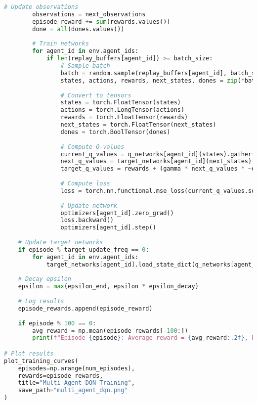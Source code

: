 \begin{lstlisting}[language=python, caption=Multi-Agent DQN Training]
        # Update observations
        observations = next_observations
        episode_reward += sum(rewards.values())
        done = all(dones.values())
        
        # Train networks
        for agent_id in env.agent_ids:
            if len(replay_buffers[agent_id]) >= batch_size:
                # Sample batch
                batch = random.sample(replay_buffers[agent_id], batch_size)
                states, actions, rewards, next_states, dones = zip(*batch)
                
                # Convert to tensors
                states = torch.FloatTensor(states)
                actions = torch.LongTensor(actions)
                rewards = torch.FloatTensor(rewards)
                next_states = torch.FloatTensor(next_states)
                dones = torch.BoolTensor(dones)
                
                # Compute Q-values
                current_q_values = q_networks[agent_id](states).gather(1, actions.unsqueeze(1))
                next_q_values = target_networks[agent_id](next_states).max(1)[0].detach()
                target_q_values = rewards + (gamma * next_q_values * ~dones)
                
                # Compute loss
                loss = torch.nn.functional.mse_loss(current_q_values.squeeze(), target_q_values)
                
                # Update network
                optimizers[agent_id].zero_grad()
                loss.backward()
                optimizers[agent_id].step()
    
    # Update target networks
    if episode % target_update_freq == 0:
        for agent_id in env.agent_ids:
            target_networks[agent_id].load_state_dict(q_networks[agent_id].state_dict())
    
    # Decay epsilon
    epsilon = max(epsilon_end, epsilon * epsilon_decay)
    
    # Log results
    episode_rewards.append(episode_reward)
    
    if episode % 100 == 0:
        avg_reward = np.mean(episode_rewards[-100:])
        print(f"Episode {episode}: Average reward = {avg_reward:.2f}, Epsilon = {epsilon:.3f}")

# Plot results
plot_training_curves(
    episodes=np.arange(num_episodes),
    rewards=episode_rewards,
    title="Multi-Agent DQN Training",
    save_path="multi_agent_dqn.png"
)
\end{lstlisting}

